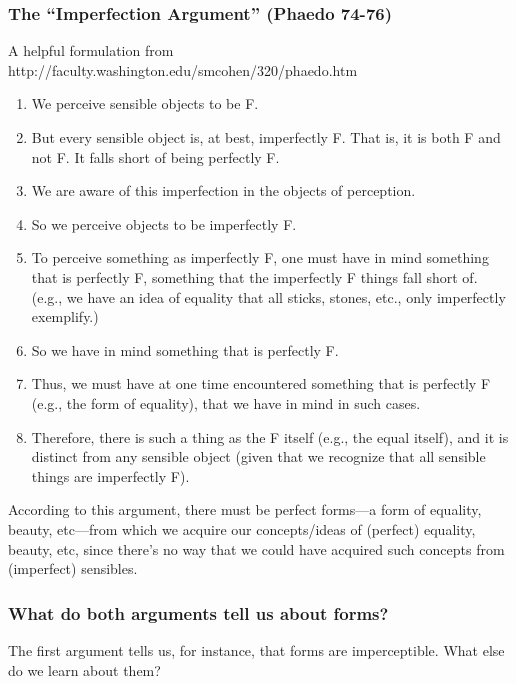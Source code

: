 \subsubsection*{The ``Imperfection Argument'' (Phaedo 74-76)}
A helpful formulation from  http://faculty.washington.edu/smcohen/320/phaedo.htm
\begin{enumerate}
\item  We perceive sensible objects to be F.
\item But every sensible object is, at best, imperfectly F. That is, it is both F and not F. It falls short of
  being perfectly F.
\item We are aware of this imperfection in the objects of perception.
\item  So we perceive objects to be imperfectly F.
\item  To perceive something as  imperfectly F, one must have in mind something that is perfectly F,  something that the imperfectly F things fall short of. (e.g., we have
  an idea of equality that all sticks, stones, etc., only imperfectly
  exemplify.)
\item So we have in mind something that is perfectly F.
\item  Thus, we must have at one time encountered something that is perfectly
  F (e.g., the form of equality), that we have in mind in such cases.
\item  Therefore, there is such a thing as the F itself (e.g., the equal itself), and it
  is distinct from any sensible object (given that we recognize that all
  sensible things are imperfectly F).
\end{enumerate}
According to this argument, there must be  perfect forms---a form of equality, beauty, etc---from which we  acquire our concepts/ideas of (perfect) equality, beauty, etc, since  there's no way that we could have acquired such concepts from  (imperfect) sensibles.

\subsubsection*{ What do both arguments tell us about forms?}

The first argument tells us, for instance, that forms are imperceptible. What else do we learn about them? 



